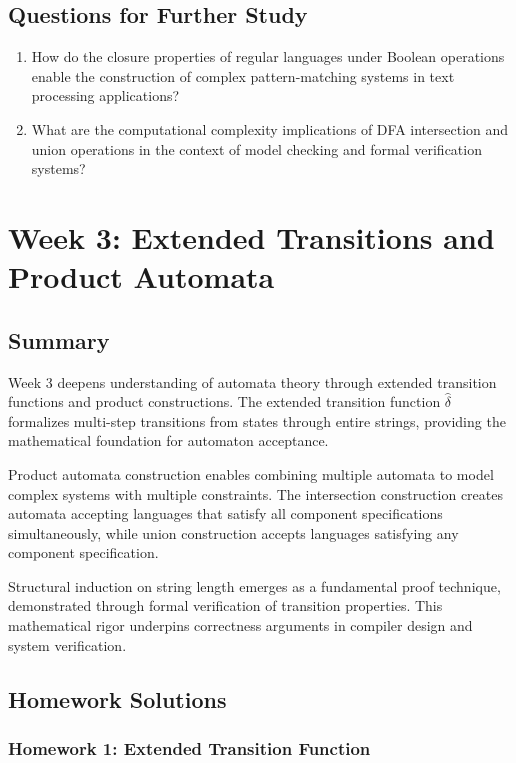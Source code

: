 \documentclass{article}
\begin{document}
\subsection{Questions for Further Study}
\begin{enumerate}
    \item How do the closure properties of regular languages under Boolean operations enable the construction of complex pattern-matching systems in text processing applications?
    
    \item What are the computational complexity implications of DFA intersection and union operations in the context of model checking and formal verification systems?
\end{enumerate}

\section{Week 3: Extended Transitions and Product Automata}

\subsection{Summary}
Week 3 deepens understanding of automata theory through extended transition functions and product constructions. The extended transition function $\hat{\delta}$ formalizes multi-step transitions from states through entire strings, providing the mathematical foundation for automaton acceptance.

Product automata construction enables combining multiple automata to model complex systems with multiple constraints. The intersection construction creates automata accepting languages that satisfy all component specifications simultaneously, while union construction accepts languages satisfying any component specification.

Structural induction on string length emerges as a fundamental proof technique, demonstrated through formal verification of transition properties. This mathematical rigor underpins correctness arguments in compiler design and system verification.

\subsection{Homework Solutions}

\subsubsection{Homework 1: Extended Transition Function}
\end{document}
